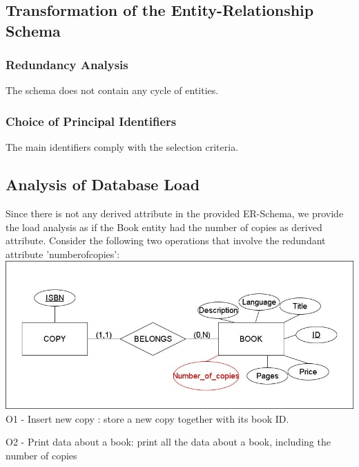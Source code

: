 \subsection{Transformation of the Entity-Relationship Schema}


\subsubsection{Redundancy Analysis}
The schema does not contain any cycle of entities.
\subsubsection{Choice of Principal Identifiers}
The main identifiers comply with the selection criteria.

\subsection{Analysis of Database Load}
Since there is not any derived attribute in the provided ER-Schema, we provide the load analysis as if the Book entity had the number of copies as derived attribute. Consider the following two operations that involve the redundant attribute 'numberofcopies': \newline
\includegraphics[scale=0.4]{sections/Relation.jpeg} \newline
O1 - Insert new copy : store a new copy together with its book ID. 

O2 - Print data about a book: print all the data about a book, including the number of copies 


